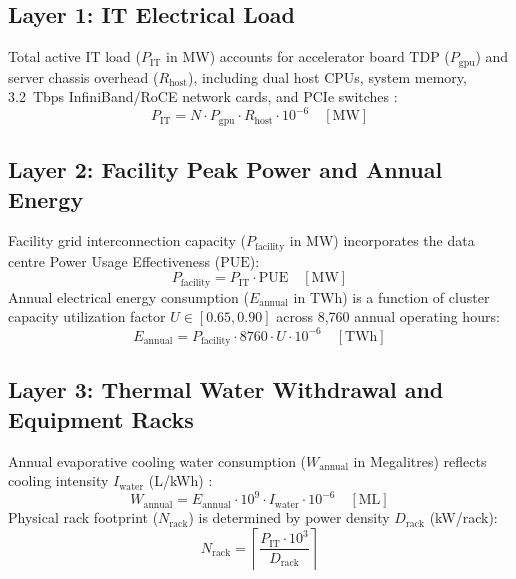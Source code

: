 \documentclass[conference]{IEEEtran}
\begin{document}
\subsection{Layer 1: IT Electrical Load}
Total active IT load ($P_{\text{IT}}$ in MW) accounts for accelerator board TDP ($P_{\text{gpu}}$) and server chassis overhead ($R_{\text{host}}$), including dual host CPUs, system memory, 3.2~Tbps InfiniBand/RoCE network cards, and PCIe switches \cite{nvidia2024dgx}:
\begin{equation}
P_{\text{IT}} = N \cdot P_{\text{gpu}} \cdot R_{\text{host}} \cdot 10^{-6} \quad [\text{MW}]
\label{eq:it_load}
\end{equation}

\subsection{Layer 2: Facility Peak Power and Annual Energy}
Facility grid interconnection capacity ($P_{\text{facility}}$ in MW) incorporates the data centre Power Usage Effectiveness ($\text{PUE}$):
\begin{equation}
P_{\text{facility}} = P_{\text{IT}} \cdot \text{PUE} \quad [\text{MW}]
\label{eq:facility_power}
\end{equation}
Annual electrical energy consumption ($E_{\text{annual}}$ in TWh) is a function of cluster capacity utilization factor $U \in [0.65, 0.90]$ across 8,760 annual operating hours:
\begin{equation}
E_{\text{annual}} = P_{\text{facility}} \cdot 8760 \cdot U \cdot 10^{-6} \quad [\text{TWh}]
\label{eq:energy}
\end{equation}

\subsection{Layer 3: Thermal Water Withdrawal and Equipment Racks}
Annual evaporative cooling water consumption ($W_{\text{annual}}$ in Megalitres) reflects cooling intensity $I_{\text{water}}$ (L/kWh) \cite{iea2024aienergy}:
\begin{equation}
W_{\text{annual}} = E_{\text{annual}} \cdot 10^{9} \cdot I_{\text{water}} \cdot 10^{-6} \quad [\text{ML}]
\label{eq:water}
\end{equation}
Physical rack footprint ($N_{\text{rack}}$) is determined by power density $D_{\text{rack}}$ (kW/rack):
\begin{equation}
N_{\text{rack}} = \left\lceil \frac{P_{\text{IT}} \cdot 10^{3}}{D_{\text{rack}}} \right\rceil
\label{eq:racks}
\end{equation}
\end{document}
